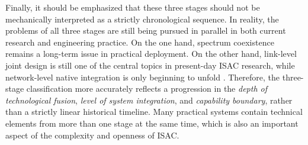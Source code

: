 Finally, it should be emphasized that these three stages should not be mechanically interpreted as a strictly chronological sequence. In reality, the problems of all three stages are still being pursued in parallel in both current research and engineering practice. On the one hand, spectrum coexistence remains a long-term issue in practical deployment. On the other hand, link-level joint design is still one of the central topics in present-day ISAC research, while network-level native integration is only beginning to unfold \cite{Liu2022ISAC,Gonzalez2024integrated,Cui2024integrated}. Therefore, the three-stage classification more accurately reflects a progression in the \emph{depth of technological fusion}, \emph{level of system integration}, and \emph{capability boundary}, rather than a strictly linear historical timeline. Many practical systems contain technical elements from more than one stage at the same time, which is also an important aspect of the complexity and openness of ISAC.
